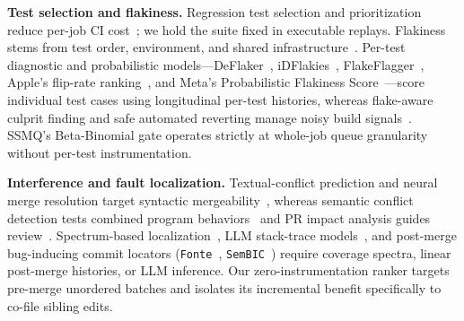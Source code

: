 \textbf{Test selection and flakiness.} Regression test selection and prioritization reduce per-job CI cost~\cite{spieker2017reinforcement,leong2019assessing,machalica2019predictive,jin2023hybridcisave,schwendner2025practical}; we hold the suite fixed in executable replays. Flakiness stems from test order, environment, and shared infrastructure~\cite{luo2014empirical,lam2020large,romano2021empirical,tahir2023test,parry2025systemic}. Per-test diagnostic and probabilistic models---DeFlaker~\cite{bell2018laker}, iDFlakies~\cite{lam2019idflakies}, FlakeFlagger~\cite{alshammari2021flakeflagger}, Apple's flip-rate ranking~\cite{kowalczyk2020modeling}, and Meta's Probabilistic Flakiness Score~\cite{machalica2020probabilistic}---score individual test cases using longitudinal per-test histories, whereas flake-aware culprit finding and safe automated reverting manage noisy build signals~\cite{ziftci2017broke,henderson2023flake,henderson2024saferevert}. SSMQ's Beta-Binomial gate operates strictly at whole-job queue granularity without per-test instrumentation.

\textbf{Interference and fault localization.} Textual-conflict prediction and neural merge resolution target syntactic mergeability~\cite{owhadikareshk2019predicting,zhang2022trained,svyatkovskiy2022program}, whereas semantic conflict detection tests combined program behaviors~\cite{dasilva2024semantic} and PR impact analysis guides review~\cite{gmen2025enhanced}. Spectrum-based localization~\cite{jones2005empirical,abreu2009practical}, LLM stack-trace models~\cite{jambigi2025fault}, and post-merge bug-inducing commit locators (\texttt{Fonte}~\cite{an2023fonte}, \texttt{SemBIC}~\cite{chen2025sembic}) require coverage spectra, linear post-merge histories, or LLM inference. Our zero-instrumentation ranker targets pre-merge unordered batches and isolates its incremental benefit specifically to co-file sibling edits.
